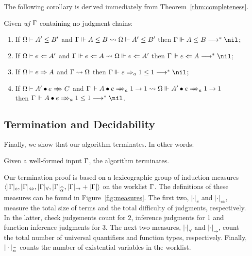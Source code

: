 The following corollary is derived immediately from Theorem~\ref{thm:completeness}.
\begin{corollary}
Given \emph{wf }$\Gamma$ containing no judgment chains:
\begin{enumerate}
    \item If $\Omega \vdash A' \le B'$ and $\Gamma \Vdash A \le B \rightsquigarrow \Omega \Vdash A' \le B'$
        then $\Gm \Vdash A \le B \redto \nil$;
    \item If $\Omega \vdash e \Leftarrow A'$ and $\Gamma \Vdash e \Leftarrow A \rightsquigarrow \Omega \Vdash e \Leftarrow A'$
        then $\Gm \Vdash e \Lto A \redto \nil$;
    \item If $\Omega \vdash e \Rightarrow A$ and $\Gamma \rightsquigarrow \Omega$
        then $\Gm \Vdash e \To_a 1 \le 1 \redto \nil$;
    \item If $\Om \vdash \appInf{A'}{e}{C}$ and
        $\Gm \Vdash \appInfAlg{A}{e}[a][1 \to 1] \sto \Om \Vdash \appInfAlg{A'}{e}[a][1 \to 1]$
        \\
        then $\Gm \Vdash \appInfAlg{A}{e}[a][1 \le 1] \redto \nil$.
\end{enumerate}
\end{corollary}

\subsection{Termination and Decidability}

Finally, we show that our algorithm terminates. In other words:
\begin{theorem}[Termination]
Given a well-formed input $\Gamma$, the algorithm terminates.
\end{theorem}
Our termination proof is based on a lexicographic group of induction measures\\
$\langle |\Gm|_e, |\Gm|_\Leftrightarrow, |\Gm|_\forall, |\Gm|_{\al}, |\Gm|_\to + |\Gm| \rangle$
on the worklist $\Gamma$. The definitions of these measures can be found in Figure~\ref{fig:measures}. The first two, 
$|\cdot|_e$ and $|\cdot|_\Leftrightarrow$, measure the total size of terms
and the total difficulty of judgments, respectively. In the latter, check judgements
count for 2, inference judgments for 1 and function inference judgments for 3.
The next two measures, $|\cdot|_\forall$ and $|\cdot|_\to$, count the total number of
universal quantifiers and function types, respectively. Finally,
$|\cdot|_{\al}$ counts the number of existential variables in the worklist.

